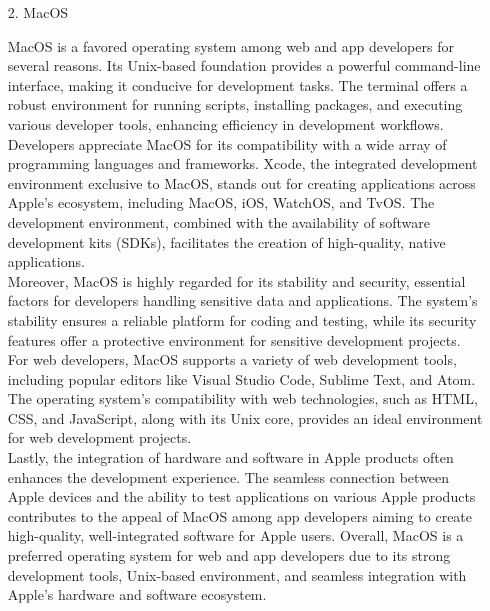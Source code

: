 \documentclass[conference]{IEEEtran}
\begin{document}
\begin{enumerate}
\begin{enumerate}
    \item[2.] MacOS \cite{sherry2013foundation}
    \item[] MacOS is a favored operating system among web and app developers for several reasons. Its Unix-based foundation provides a powerful command-line interface, making it conducive for development tasks. The terminal offers a robust environment for running scripts, installing packages, and executing various developer tools, enhancing efficiency in development workflows.
    \\
    Developers appreciate MacOS for its compatibility with a wide array of programming languages and frameworks. Xcode, the integrated development environment exclusive to MacOS, stands out for creating applications across Apple's ecosystem, including MacOS, iOS, WatchOS, and TvOS. The development environment, combined with the availability of software development kits (SDKs), facilitates the creation of high-quality, native applications.
    \\
    Moreover, MacOS is highly regarded for its stability and security, essential factors for developers handling sensitive data and applications. The system's stability ensures a reliable platform for coding and testing, while its security features offer a protective environment for sensitive development projects.
    \\
    For web developers, MacOS supports a variety of web development tools, including popular editors like Visual Studio Code, Sublime Text, and Atom. The operating system's compatibility with web technologies, such as HTML, CSS, and JavaScript, along with its Unix core, provides an ideal environment for web development projects.
    \\
    Lastly, the integration of hardware and software in Apple products often enhances the development experience. The seamless connection between Apple devices and the ability to test applications on various Apple products contributes to the appeal of MacOS among app developers aiming to create high-quality, well-integrated software for Apple users. Overall, MacOS is a preferred operating system for web and app developers due to its strong development tools, Unix-based environment, and seamless integration with Apple's hardware and software ecosystem. \\


\end{enumerate}
\end{enumerate}
\end{document}
